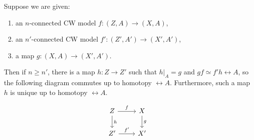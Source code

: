 \begin{proposition}[]
    Suppose we are given:
    \begin{enumerate}
        \item an $n$-connected CW model $f \colon (Z,A) \to 
            (X,A)$,
        \item an $n'$-connected CW model $f' \colon
            \left( Z',A' \right) \to (X',A')$,
        \item a map $g \colon (X,A) \to (X',A')$.
    \end{enumerate}
    Then if $n\ge n'$, there is a map $h \colon Z \to Z'$ such
    that $h |_{A} = g$ and $gf \simeq f'h \rel A$, so
    the following diagram commutes up to homotopy
    $\rel A$. Furthermore, such a map $h$ is unique
    up to homotopy $\rel A$.

    \begin{equation*}
    \begin{tikzcd}
        Z \ar[r, "f"] \ar[d, "h"] & X \ar[d, "g"] \\
        Z' \ar[r, "f'"] & X'
    \end{tikzcd}
    \end{equation*}
    
\end{proposition}


